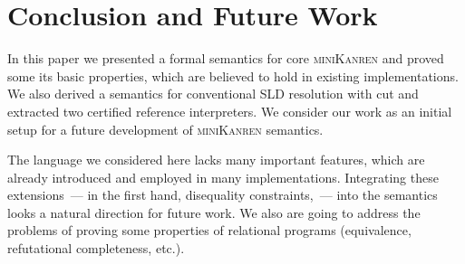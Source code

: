 \section{Conclusion and Future Work}

In this paper we presented a formal semantics for core \textsc{miniKanren} and proved some its basic properties,
which are believed to hold in existing implementations. We also derived a semantics for conventional SLD resolution
with cut and extracted two certified reference interpreters. We consider our work as an initial setup for a future development
of \textsc{miniKanren} semantics.

The language we considered here lacks many important features, which are already introduced
and employed in many implementations. Integrating these extensions~--- in the first hand, disequality constraints,~--- into
the semantics looks a natural direction for future work. We also are going to address the problems of proving some
properties of relational programs (equivalence, refutational completeness, etc.).

